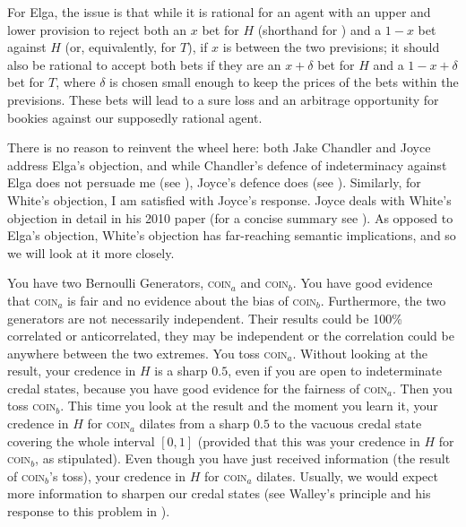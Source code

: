 \documentclass[11pt]{article}
\begin{document}
For Elga, the issue is that while it is rational for an agent with an
upper and lower provision to reject both an $x$ bet for $H$ (shorthand
for ) and a
$1-x$ bet against $H$ (or, equivalently, for $T$), if $x$ is between
the two previsions; it should also be rational to accept both bets if
they are an $x+\delta$ bet for $H$ and a $1-x+\delta$ bet for $T$,
where $\delta$ is chosen small enough to keep the prices of the bets
within the previsions. These bets will lead to a sure loss and an
arbitrage opportunity for bookies against our supposedly rational
agent.

There is no reason to reinvent the wheel here: both Jake Chandler and
Joyce address Elga's objection, and while Chandler's defence of
indeterminacy against Elga does not persuade me (see
), Joyce's defence does (see
). Similarly, for White's objection, I am
satisfied with Joyce's response. Joyce deals with White's objection in
detail in his 2010 paper (for a concise summary see
). As opposed to Elga's objection,
White's objection has far-reaching semantic implications, and so we
will look at it more closely.

You have two Bernoulli Generators, \textsc{coin}$_{a}$ and
\textsc{coin}$_{b}$. You have good evidence that \textsc{coin}$_{a}$
is fair and no evidence about the bias of \textsc{coin}$_{b}$.
Furthermore, the two generators are not necessarily independent. Their
results could be 100\% correlated or anticorrelated, they may be
independent or the correlation could be anywhere between the two
extremes. You toss \textsc{coin}$_{a}$. Without looking at the result,
your credence in $H$ is a sharp $0.5$, even if you are open to
indeterminate credal states, because you have good evidence for the
fairness of \textsc{coin}$_{a}$. Then you toss \textsc{coin}$_{b}$.
This time you look at the result and the moment you learn it, your
credence in $H$ for \textsc{coin}$_{a}$ dilates from a sharp $0.5$ to
the vacuous credal state covering the whole interval $[0,1]$ (provided
that this was your credence in $H$ for \textsc{coin}$_{b}$, as
stipulated). Even though you have just received information (the
result of \textsc{coin}$_{b}$'s toss), your credence in $H$ for
\textsc{coin}$_{a}$ dilates. Usually, we would expect more information
to sharpen our credal states (see Walley's  principle and his response to this problem in
). 
\end{document}
